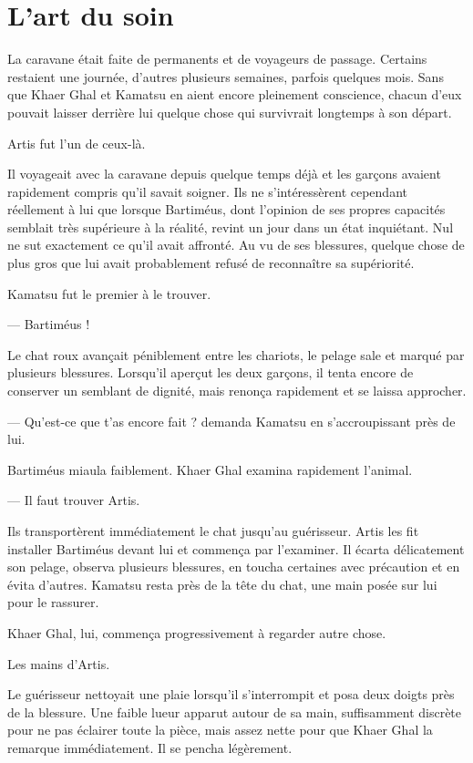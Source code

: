\chapter{L'art du soin}
\label{chap:l-art-du-soin}

La caravane était faite de permanents et de voyageurs de passage. Certains
restaient une journée, d'autres plusieurs semaines, parfois quelques mois.
Sans que Khaer Ghal et Kamatsu en aient encore pleinement conscience, chacun
d'eux pouvait laisser derrière lui quelque chose qui survivrait longtemps à
son départ.

Artis fut l'un de ceux-là.

Il voyageait avec la caravane depuis quelque temps déjà et les garçons avaient
rapidement compris qu'il savait soigner. Ils ne s'intéressèrent cependant
réellement à lui que lorsque Bartiméus, dont l'opinion de ses propres capacités
semblait très supérieure à la réalité, revint un jour dans un état inquiétant.
Nul ne sut exactement ce qu'il avait affronté. Au vu de ses blessures, quelque
chose de plus gros que lui avait probablement refusé de reconnaître sa
supériorité.

Kamatsu fut le premier à le trouver.

— Bartiméus !

Le chat roux avançait péniblement entre les chariots, le pelage sale et marqué
par plusieurs blessures. Lorsqu'il aperçut les deux garçons, il tenta encore de
conserver un semblant de dignité, mais renonça rapidement et se laissa
approcher.

— Qu'est-ce que t'as encore fait ? demanda Kamatsu en s'accroupissant près de
lui.

Bartiméus miaula faiblement. Khaer Ghal examina rapidement l'animal.

— Il faut trouver Artis.

Ils transportèrent immédiatement le chat jusqu'au guérisseur. Artis les fit
installer Bartiméus devant lui et commença par l'examiner. Il écarta
délicatement son pelage, observa plusieurs blessures, en toucha certaines avec
précaution et en évita d'autres. Kamatsu resta près de la tête du chat, une
main posée sur lui pour le rassurer.

Khaer Ghal, lui, commença progressivement à regarder autre chose.

Les mains d'Artis.

Le guérisseur nettoyait une plaie lorsqu'il s'interrompit et posa deux doigts
près de la blessure. Une faible lueur apparut autour de sa main, suffisamment
discrète pour ne pas éclairer toute la pièce, mais assez nette pour que Khaer
Ghal la remarque immédiatement. Il se pencha légèrement.

